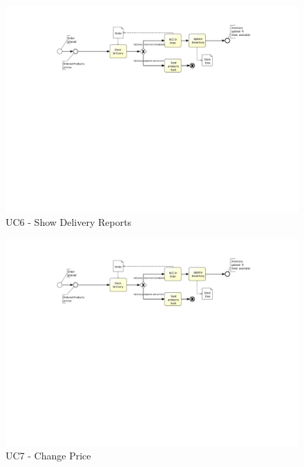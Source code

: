 \begin{figure}[h!]
	\centering
	\includegraphics[width=\textwidth, trim={5cm 14cm 6cm 2cm}]{img/UC4.pdf}
	\caption{UC6 - Show Delivery Reports }
	\label{fig:UC6}
\end{figure}

\begin{figure}[h!]
	\centering
	\includegraphics[width=\textwidth, trim={5cm 14cm 6cm 2cm}]{img/UC4.pdf}
	\caption{UC7 - Change Price }
	\label{fig:UC7}
\end{figure}






